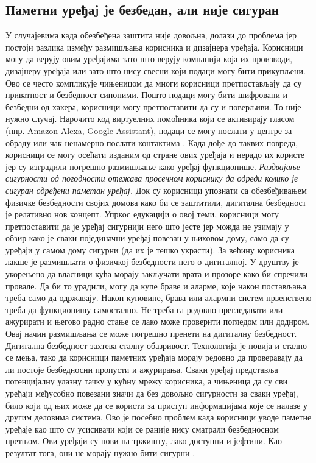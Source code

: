 \documentclass[a4paper]{article}
\begin{document}
\subsection{Паметни уређаj jе безбедан, али ниjе сигуран}
У случајевима када обезбеђена заштита није довољна, долази до проблема јер постоји разлика између размишљања корисника и
дизајнера уређаја. Корисници могу да верују овим уређајима зато што верују компанији која их производи, дизајнеру уређаја или зато
што нису свесни који подаци могу бити прикупљени. Ово се често компликује чињеницом да многи корисници претпостављају да су приватност и
безбедност синоними. Пошто подаци могу бити шифровани и безбедни од хакера, корисници могу претпоставити да су и поверљиви. То није нужно случај.
Нарочито код виртуелних помоћника који се активирају гласом (нпр. Amazon Alexa, Google Assistant), подаци се могу послати у центре за обраду или
чак ненамерно послати контактима \cite{1} \cite{2}. Када дође до таквих повреда, корисници се могу осећати изданим од стране ових уређаја и нерадо их
користе јер су изградили погрешно размишљање како уређај функционише.
\newline \newline
\emph{Раздвајање сигурности од погодности отежава просечном кориснику да одреди колико је сигуран одређени паметан уређај.}
\newline  \newline
Док су корисници упознати са обезбеђивањем физичке безбедности својих домова како би се заштитили, дигитална безбедност је релативно
нов концепт. Упркос едукацији о овој теми, корисници могу претпоставити да је уређај сигурнији него што јесте јер можда не узимају
у обзир како је сваки појединачни уређај повезан у њиховом дому, само да су уређаји у самом дому сигурни (да их је тешко украсти).
\newline  \newline
За већину корисника лакше је размишљати о физичкој безбедности него о дигиталној. У друштву је укорењено да власници кућа морају закључати
врата и прозоре како би спречили провале. Да би то урадили, могу да купе браве и аларме, које након постављања треба само да одржавају.
Након куповине, брава или алармни систем првенствено треба да функционишу самостално. Не треба га редовно прегледавати или ажурирати и
његово радно стање се лако може проверити погледом или додиром. Овај начин размишљања се може погрешно пренети на дигиталну безбедност.
\newline  \newline
Дигитална безбедност захтева сталну обазривост. Технологија је новија и стално се мења, тако да корисници паметних уређаја морају редовно да
проверавају да ли постоје безбедносни пропусти и ажурирања. Сваки уређај представља потенцијалну улазну тачку у кућну мрежу корисника, а
чињеница да су сви уређаји међусобно повезани значи да без довољно сигурности за сваки уређај, било који од њих може да се користи за приступ
информацијама које се налазе у другим деловима система. Ово је посебно проблем када корисници уводе паметне уређаје као што су усисивачи који се
раније нису сматрали безбедносном претњом. Ови уређаји су нови на тржишту, лако доступни и јефтини. Као резултат тога, они не морају нужно бити сигурни \cite{3}.
\end{document}
